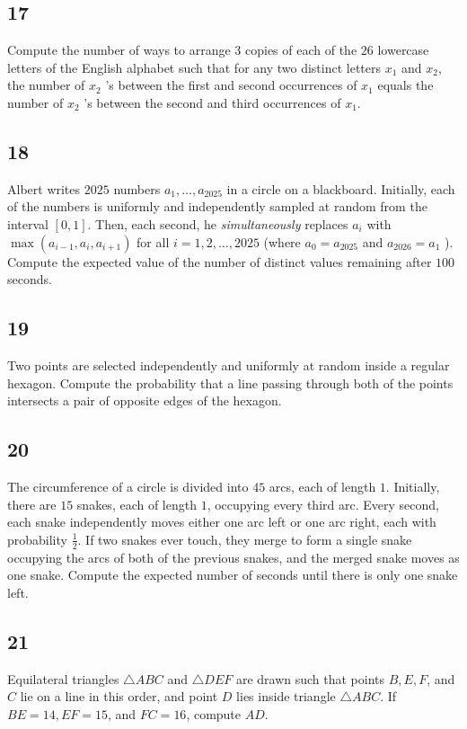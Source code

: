 \subsection{17}
Compute the number of ways to arrange $3$ copies of each of the $26$ lowercase letters of the English alphabet such that for any two distinct letters $x_{1}$ and $x_{2}$, the number of $x_{2}$ 's between the first and second occurrences of $x_{1}$ equals the number of $x_{2}$ 's between the second and third occurrences of $x_{1}$.

\subsection{18}
Albert writes $2025$ numbers $a_{1}, \ldots, a_{2025}$ in a circle on a blackboard. Initially, each of the numbers is uniformly and independently sampled at random from the interval $[0,1]$. Then, each second, he \emph{simultaneously} replaces $a_{i}$ with $\max \left(a_{i-1}, a_{i}, a_{i+1}\right)$ for all $i=1,2, \ldots, 2025$ (where $a_{0}=a_{2025}$ and $a_{2026}=a_{1}$ ). Compute the expected value of the number of distinct values remaining after $100$ seconds.

\subsection{19}
Two points are selected independently and uniformly at random inside a regular hexagon. Compute the probability that a line passing through both of the points intersects a pair of opposite edges of the hexagon.

\subsection{20}
The circumference of a circle is divided into $45$ arcs, each of length $1$. Initially, there are $15$ snakes, each of length $1$, occupying every third arc. Every second, each snake independently moves either one arc left or one arc right, each with probability $\frac{1}{2}$. If two snakes ever touch, they merge to form a single snake occupying the arcs of both of the previous snakes, and the merged snake moves as one snake. Compute the expected number of seconds until there is only one snake left.

\subsection{21}
Equilateral triangles $\triangle A B C$ and $\triangle D E F$ are drawn such that points $B, E, F$, and $C$ lie on a line in this order, and point $D$ lies inside triangle $\triangle A B C$. If $B E=14, E F=15$, and $F C=16$, compute $A D$.

